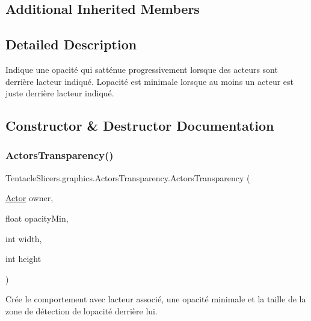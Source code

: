 \subsection*{Additional Inherited Members}


\subsection{Detailed Description}
Indique une opacité qui s\textquotesingle{}atténue progressivement lorsque des acteurs sont derrière l\textquotesingle{}acteur indiqué. L\textquotesingle{}opacité est minimale lorsque au moins un acteur est juste derrière l\textquotesingle{}acteur indiqué. 



\subsection{Constructor \& Destructor Documentation}
\mbox{\label{class_tentacle_slicers_1_1graphics_1_1_actors_transparency_a42f066e20b0811eb02981b4504e5c8da}} 
\subsubsection{\texorpdfstring{Actors\+Transparency()}{ActorsTransparency()}}
{\footnotesize\ttfamily Tentacle\+Slicers.\+graphics.\+Actors\+Transparency.\+Actors\+Transparency (\begin{DoxyParamCaption}\item[{\hyperlink{class_tentacle_slicers_1_1actors_1_1_actor}{Actor}}]{owner,  }\item[{float}]{opacity\+Min,  }\item[{int}]{width,  }\item[{int}]{height }\end{DoxyParamCaption})}



Crée le comportement avec l\textquotesingle{}acteur associé, une opacité minimale et la taille de la zone de détection de l\textquotesingle{}opacité derrière lui. 


